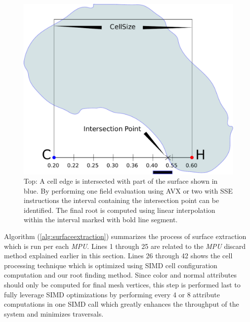\begin{figure}[H]
  \centering
  \includegraphics[width=0.8\linewidth]{figures/cpupoly/root.pdf}
  \caption{\label{fig:root}
  {Top: A cell edge is intersected with part of the surface shown in blue.  By performing one field evaluation using 
  AVX or two with SSE instructions the interval containing the intersection point can be identified. 
  The final root is computed using linear interpolation within the interval marked with bold line segment.}
}
\end{figure}


Algorithm (\ref{alg:surfaceextraction}) summarizes the process of surface extraction which is run per each \textit{MPU}. 
Lines 1 through 25 are related to the \textit{MPU} discard method explained earlier in this section. Lines 26 through 42
shows the cell processing technique which is optimized using SIMD cell configuration computation and our root 
finding method. Since color and normal attributes should only be computed for final mesh vertices, this step is 
performed last to fully leverage SIMD optimizations by performing every 4 or 8 attribute computations in 
one SIMD call which greatly enhances the throughput of the system and minimizes \blob traversals.

